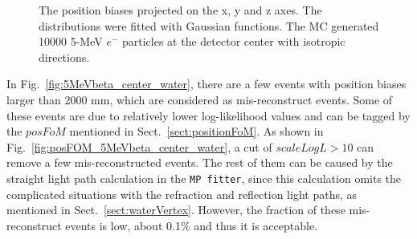 \begin{figure}[htbp]
{\begin{minipage}[b]{0.4\textwidth}
		\end{minipage}
	}
	\caption[The position biases projected on the x, y and z axes.]{The position biases projected on the x, y and z axes. The distributions were fitted with Gaussian functions. The MC generated 10000 5-MeV $e^-$ particles at the detector center with isotropic directions.}
\end{figure}

In Fig.~\ref{fig:5MeVbeta_center_water}, there are a few events with position biases larger than 2000 mm, which are considered as mis-reconstruct events. Some of these events are due to relatively lower log-likelihood values and can be tagged by the $posFoM$ mentioned in Sect.~\ref{sect:positionFoM}. As shown in Fig.~\ref{fig:posFOM_5MeVbeta_center_water}, a cut of $scaleLogL>10$ can remove a few mis-reconstructed events. The rest of them can be caused by the straight light path calculation in the \texttt{MP fitter}, since this calculation omits the complicated situations with the refraction and reflection light paths, as mentioned in Sect.~\ref{sect:waterVertex}. However, the fraction of these mis-reconstruct events is low, about 0.1\% and thus it is acceptable.

